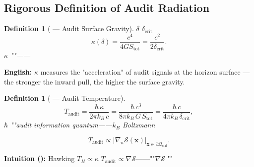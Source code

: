 \documentclass[12pt,a4paper]{article}
\newtheorem{definition}[theorem]{Definition}
\theoremstyle{remark}
\newcommand{\x}{\mathbf{x}}
\newcommand{\cG}{G}          %
\newcommand{\cC}{c}          %
\newcommand{\cK}{\kappa}     %
\newcommand{\cH}{\hbar}      %
\begin{document}
\subsection{Rigorous Definition of Audit Radiation}

\begin{definition}[ — Audit Surface Gravity]\label{def:audit_surface_gravity}
 $\delta$ $\delta_{\mathrm{crit}}$ \textbf{}
\begin{equation}
    \cK(\delta) = \frac{\cC^4}{4\cG S_{\mathrm{tot}}} = \frac{\cC^2}{2\delta_{\mathrm{crit}}}.
    \label{eq:audit_surface_gravity}
\end{equation}
$\cK$ ""——
\end{definition}

\vspace{4pt}
\noindent
\textbf{English:} $\cK$ measures the "acceleration" of audit signals at the horizon surface — the stronger the inward pull, the higher the surface gravity.

\begin{definition}[ — Audit Temperature]\label{def:audit_temperature}
\textbf{}
\begin{equation}
    T_{\mathrm{audit}} = \frac{\cH\, \cK}{2\pi k_B\, \cC} = \frac{\cH\, \cC^3}{8\pi k_B\, \cG\, S_{\mathrm{tot}}} = \frac{\cH\, \cC}{4\pi k_B\, \delta_{\mathrm{crit}}},
    \label{eq:audit_temperature}
\end{equation}
 $\cH$ ""audit information quantum——$k_B$ Boltzmann


\begin{equation}
    T_{\mathrm{audit}} \propto \left| \nabla_n \mathcal{S}(\x) \right|_{\x \in \partial\Omega_{\mathrm{crit}}}.
    \label{eq:temp_gradient}
\end{equation}
\end{definition}

\vspace{4pt}
\noindent
\textbf{Intuition ():} Hawking $T_H \propto \kappa$ $T_{\mathrm{audit}} \propto \nabla\mathcal{S}$——""$\nabla\mathcal{S}$ ""
\end{document}

